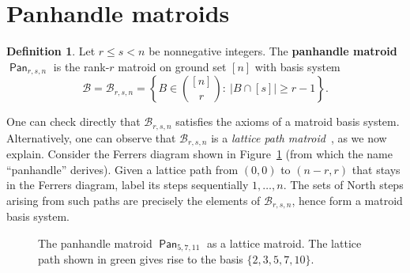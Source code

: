 \documentclass[11pt]{amsart}
\theoremstyle{definition}
\newtheorem{definition}[theorem]{Definition}
\newcommand{\0}{\emptyset}
\newcommand{\B}{\mathcal{B}}
\newcommand{\defterm}[1]{\textbf{#1}}
\DeclareMathOperator{\Pan}{\mathsf{Pan}} %
\newcommand{\andres}[1]{\par \noindent
  \framebox{\begin{minipage}[c]{0.95 \textwidth}\color{blue} Andr\'es Note:
      #1 \end{minipage}\color{black}}\par}
\begin{document}


\section{Panhandle matroids}\label{sec:panhandle}

\begin{definition}
Let $r\leq s<n$ be nonnegative integers.
The \defterm{panhandle matroid} $\Pan_{r,s,n}$ is the rank-$r$ matroid on ground set $[n]$ with basis system \[\B=\B_{r,s,n}=\left\{B\in\binom{[n]}{r}:\ |B\cap[s]|\geq r-1\right\}.\]
\end{definition}

One can check directly that $\B_{r,s,n}$ satisfies the axioms of a matroid basis system.
Alternatively, one can observe that $\B_{r,s,n}$ is a \textit{lattice path matroid}~\cite{LPM}, as we now explain.
Consider the Ferrers diagram shown in Figure~\ref{fig:panhandle} (from which the name ``panhandle'' derives).
Given a lattice path from $(0,0)$ to $(n-r,r)$ that stays in the Ferrers diagram, label its steps sequentially $1,\dots,n$.
The sets of North steps arising from such paths are precisely the elements of $\B_{r,s,n}$, hence form a matroid basis system.

\begin{center}
\begin{figure}[ht]
\caption{The panhandle matroid $\Pan_{5,7,11}$ as a lattice matroid.  The lattice path shown in green gives rise to the basis $\{2,3,5,7,10\}$.}\label{fig:panhandle}
\end{figure}
\end{center}
\end{document}
